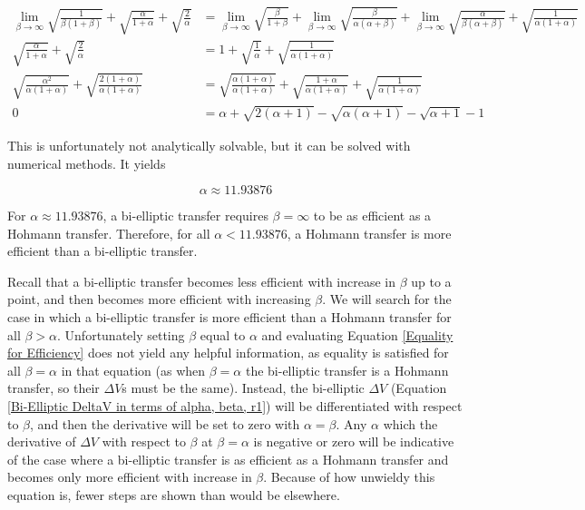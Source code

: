 \documentclass[../basicOrbitalDynamics.tex]{subfiles}
\begin{document}
\begin{align*}
    \lim_{\beta\rightarrow\infty}\sqrt{\frac{1}{\beta(1+\beta)}}+\sqrt{\frac{\alpha}{1+\alpha}}+\sqrt{\frac{2}{\alpha}} &=\lim_{\beta\rightarrow\infty}\sqrt{\frac{\beta}{1+\beta}}+\lim_{\beta\rightarrow\infty}\sqrt{\frac{\beta}{\alpha(\alpha+\beta)}}+\lim_{\beta\rightarrow\infty}\sqrt{\frac{\alpha}{\beta(\alpha+\beta)}}+\sqrt{\frac{1}{\alpha(1+\alpha)}} \\
    \sqrt{\frac{\alpha}{1+\alpha}}+\sqrt{\frac{2}{\alpha}}&=1+\sqrt{\frac{1}{\alpha}}+\sqrt{\frac{1}{\alpha(1+\alpha)}}\\
    \sqrt{\frac{\alpha^2}{\alpha(1+\alpha)}}+\sqrt{\frac{2(1+\alpha)}{\alpha(1+\alpha)}}&=\sqrt{\frac{\alpha(1+\alpha)}{\alpha(1+\alpha)}}+\sqrt{\frac{1+\alpha}{\alpha(1+\alpha)}}+\sqrt{\frac{1}{\alpha(1+\alpha)}} \\
    0&=\alpha+\sqrt{2(\alpha+1)}-\sqrt{\alpha(\alpha+1)}-\sqrt{\alpha+1}-1
\end{align*}

This is unfortunately not analytically solvable, but it can be solved with numerical methods. It yields

$$\alpha\approx11.93876$$

For $\alpha\approx11.93876$, a bi-elliptic transfer requires $\beta=\infty$ to be as efficient as a Hohmann transfer. Therefore, for all $\alpha<11.93876$, a Hohmann transfer is more efficient than a bi-elliptic transfer.

Recall that a bi-elliptic transfer becomes less efficient with increase in $\beta$ up to a point, and then becomes more efficient with increasing $\beta$. We will search for the case in which a bi-elliptic transfer is more efficient than a Hohmann transfer for all $\beta>\alpha$. Unfortunately setting $\beta$ equal to $\alpha$ and evaluating Equation \eqref{Equality for Efficiency} does not yield any helpful information, as equality is satisfied for all $\beta=\alpha$ in that equation (as when $\beta=\alpha$ the bi-elliptic transfer is a Hohmann transfer, so their $\Delta V$s must be the same). Instead, the bi-elliptic $\Delta V$ (Equation \eqref{Bi-Elliptic DeltaV in terms of alpha, beta, r1}) will be differentiated with respect to $\beta$, and then the derivative will be set to zero with $\alpha=\beta$. Any $\alpha$ which the derivative of $\Delta V$ with respect to $\beta$ at $\beta=\alpha$ is negative or zero will be indicative of the case where a bi-elliptic transfer is as efficient as a Hohmann transfer and becomes only more efficient with increase in $\beta$. Because of how unwieldy this equation is, fewer steps are shown than would be elsewhere.
\end{document}
